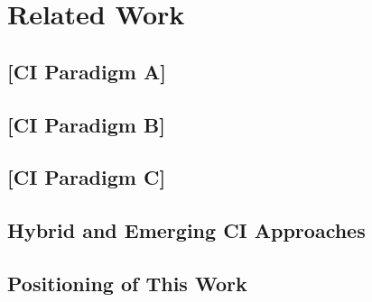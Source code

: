 \documentclass[journal,onecolumn,draftcls]{IEEEtran}
\begin{document}
\section{Related Work}
\label{sec:related}


\subsection{[CI Paradigm A]}
\label{sec:related-paradigmA}


\subsection{[CI Paradigm B]}
\label{sec:related-paradigmB}


\subsection{[CI Paradigm C]}
\label{sec:related-paradigmC}


\subsection{Hybrid and Emerging CI Approaches}
\label{sec:related-hybrid}


\subsection{Positioning of This Work}
\label{sec:related-positioning}


\end{document}
